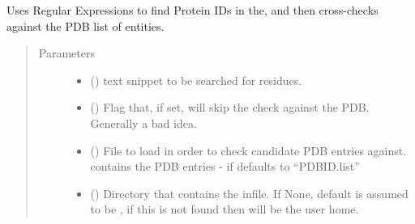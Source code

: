 \documentclass[letterpaper,10pt,english]{sphinxmanual}
\begin{document}
\begin{fulllineitems}
\label{\detokenize{functions:pyresid.identify_protein_ID}}
Uses Regular Expressions to find Protein IDs in the, and then cross-checks against the PDB list
of entities.
\begin{quote}\begin{description}
\item[{Parameters}] \leavevmode\begin{itemize}
\item {} 
 () \textendash{} text snippet to be searched for residues.

\item {} 
 (\sphinxstyleliteralemphasis{\sphinxupquote{, }}\sphinxstyleliteralemphasis{\sphinxupquote{, }}) \textendash{} Flag that, if set, will skip the check against the PDB. Generally a bad idea.

\item {} 
 (\sphinxstyleliteralemphasis{\sphinxupquote{, }}\sphinxstyleliteralemphasis{\sphinxupquote{, }}) \textendash{} File to load in order to check candidate PDB entries against. contains the PDB entries -
if  defaults to “PDBID.list”

\item {} 
 (\sphinxstyleliteralemphasis{\sphinxupquote{, }}\sphinxstyleliteralemphasis{\sphinxupquote{, }}) \textendash{} Directory that contains the infile. If None, default is assumed to be , if this
is not found then will be the user home.


\end{itemize}
\end{description}
\end{quote}
\end{fulllineitems}
\end{document}
